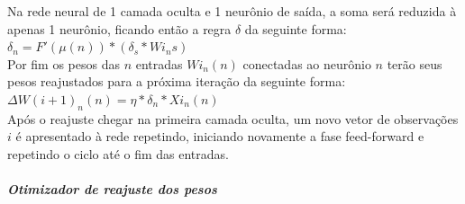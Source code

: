             Na rede neural de 1 camada oculta e 1 neurônio de saída, a soma será reduzida à apenas 1 neurônio, ficando então a regra $\delta$ da seguinte forma:\\
            
            $\delta_n = F'(\mu(n))*(\delta_s*Wi_{n}s)$\\
            
            Por fim os pesos das $n$ entradas $Wi_{n}(n)$ conectadas ao neurônio $n$ terão seus pesos reajustados para a próxima iteração da seguinte forma:\\
            $\Delta W(i+1)_{n}(n) = \eta*\delta_n*Xi_{n}(n)$\\
            
            Após o reajuste chegar na primeira camada oculta, um novo vetor de observações $i$ é apresentado à rede repetindo, iniciando novamente a fase feed-forward e repetindo o ciclo até o fim das entradas.
            
        \subparagraph{Otimizador de reajuste dos pesos}
        
